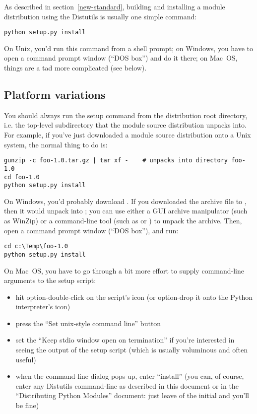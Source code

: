 \documentclass{howto}
\begin{document}
As described in section~\ref{new-standard}, building and installing
a module distribution using the Distutils is usually one simple command:
\begin{verbatim}
python setup.py install
\end{verbatim}
On Unix, you'd run this command from a shell prompt; on Windows, you
have to open a command prompt window (``DOS box'') and do it there; on
Mac~OS, things are a tad more complicated (see below).


\subsection{Platform variations}
\label{platform-variations}

You should always run the setup command from the distribution root
directory, i.e. the top-level subdirectory that the module source
distribution unpacks into.  For example, if you've just downloaded a
module source distribution  onto a Unix system, the
normal thing to do is:
\begin{verbatim}
gunzip -c foo-1.0.tar.gz | tar xf -    # unpacks into directory foo-1.0
cd foo-1.0
python setup.py install
\end{verbatim}

On Windows, you'd probably download .  If you
downloaded the archive file to , then it
would unpack into ;
you can use either a GUI archive manipulator (such as WinZip) or a
command-line tool (such as  or ) to
unpack the archive.  Then, open a command prompt window (``DOS box''),
and run:
\begin{verbatim}
cd c:\Temp\foo-1.0
python setup.py install
\end{verbatim}

On Mac~OS, you have to go through a bit more effort to supply
command-line arguments to the setup script:
\begin{itemize}
\item hit option-double-click on the script's icon (or option-drop it
  onto the Python interpreter's icon)
\item press the ``Set unix-style command line'' button
\item set the ``Keep stdio window open on termination'' if you're
  interested in seeing the output of the setup script (which is usually
  voluminous and often useful)
\item when the command-line dialog pops up, enter ``install'' (you
  can, of course, enter any Distutils command-line as described in this
  document or in the ``Distributing Python Modules'' document: just
  leave of the initial  and you'll be fine)
\end{itemize}
\end{document}
